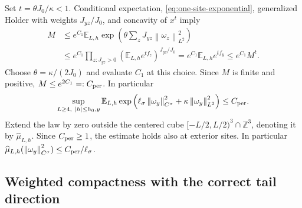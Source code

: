 \documentclass[11pt]{article}
\numberwithin{equation}{section}
\theoremstyle{definition}
\newcommand{\Z}{\mathbb Z}
\newcommand{\E}{\mathbb E}
\newcommand{\norm}[1]{\left\lVert#1\right\rVert}
\begin{document}
Set $t=\theta J_0/\kappa<1$.  Conditional expectation,
\eqref{eq:one-site-exponential}, generalized Holder with weights
$J_{yz}/J_0$, and concavity of $x^t$ imply
\begin{align}
 M&\leq e^{C_1}\E_{L,h}
          \exp\left(\theta\sum_zJ_{yz}\norm{\omega_z}_{L^2}^2\right)
 \nonumber\\
 &\leq e^{C_1}\prod_{z:J_{yz}>0}
       (\E_{L,h}e^{tf_z})^{J_{yz}/J_0}
 =e^{C_1}\E_{L,h}e^{tf_y}\leq e^{C_1}M^t.
 \label{eq:periodic-holder-closure}
\end{align}
Choose $\theta=\kappa/(2J_0)$ and evaluate $C_1$ at this choice.
Since $M$ is finite and positive, $M\leq e^{2C_1}=:C_{\rm per}$.
In particular
\begin{equation}
 \sup_{L\geq4,\ |h|\leq h_0,y}\E_{L,h}
 \exp\left(\ell_\sigma\norm{\omega_y}_{C^\sigma}^2
                   +\kappa\norm{\omega_y}_{L^2}^2\right)
 \leq C_{\rm per}. \label{eq:periodic-moment}
\end{equation}
Extend the law by zero outside the centered cube
$[-L/2,L/2)^3\cap\Z^3$, denoting it by $\widehat\mu_{L,h}$.
Since $C_{\rm per}\geq1$, the estimate holds also at exterior sites.
In particular $\widehat\mu_{L,h}(\norm{\omega_y}_{C^\sigma}^2)
\leq C_{\rm per}/\ell_\sigma$.

\subsection{Weighted compactness with the correct tail direction}
\label{sec:dlr-weighted-compactness}
\end{document}
